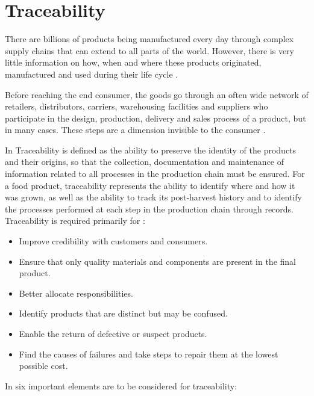 \section{Traceability}\label{sec:traceability}

There are billions of products being manufactured every day through complex supply chains that can extend to all parts of the world. However, there is very little information on how, when and where these products originated, manufactured and used during their life cycle \cite{horiuchirastreabilidade}.

Before reaching the end consumer, the goods go through an often wide network of retailers, distributors, carriers, warehousing facilities and suppliers who participate in the design, production, delivery and sales process of a product, but in many cases. These steps are a dimension invisible to the consumer \cite{provenance2015}.

In \cite{gryna1998juran, Opara2001} Traceability is defined as the ability to preserve the identity of the products and their origins, so that the collection, documentation and maintenance of information related to all processes in the production chain must be ensured. For a food product, traceability represents the ability to identify where and how it was grown, as well as the ability to track its post-harvest history and to identify the processes performed at each step in the production chain through records. Traceability is required primarily for \cite{horiuchirastreabilidade}:
\begin{itemize}
\item Improve credibility with customers and consumers.
\item Ensure that only quality materials and components are present in the final product.
\item Better allocate responsibilities.
\item Identify products that are distinct but may be confused.
\item Enable the return of defective or suspect products.
\item Find the causes of failures and take steps to repair them at the lowest possible cost.
\end{itemize}

In \cite{opara2003traceability} six important elements are to be considered for traceability:

